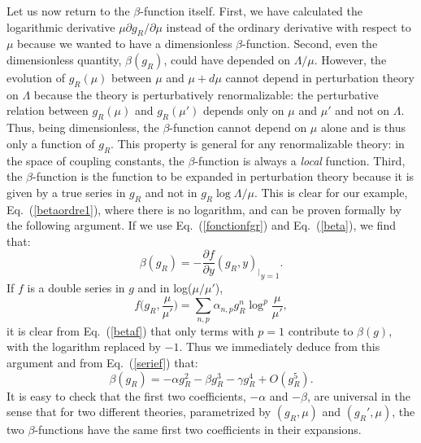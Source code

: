 \documentclass[floatfix,twocolumn,preprintnumbers,amsmath,amssymb,prb]{revtex4}
\begin{document}
{\begin{enumerate}[(i)]
\end{enumerate}

Let us now return to the $\beta$-function itself. First, we have
calculated the logarithmic derivative
$\mu\partial g_R/\partial\mu$ instead of the ordinary derivative
with respect to $\mu$ because we wanted
to have a dimensionless $\beta$-function. Second, even the
dimensionless quantity,
$\beta(g_R)$, could have depended on $\Lambda/\mu$.
However, the evolution of $g_R(\mu)$ between $\mu$ and
$\mu+d\mu$ cannot depend in perturbation theory on
$\Lambda$ because the theory is perturbatively renormalizable: the
perturbative relation between $g_R(\mu)$ and $g_R(\mu')$ depends
only on $\mu$ and
$\mu'$ and not on $\Lambda$. Thus, being dimensionless, the 
$\beta$-function cannot depend on $\mu$ alone and is thus only a
function of $g_R$. This property is general for any renormalizable
theory: in the space of coupling constants, the $\beta$-function
is always a {\em local} function. Third, the $\beta$-function is
the function to be expanded in perturbation theory because it is
given by a true series in $g_R$ and not in $g_R \log\Lambda/\mu$.
This is clear for our example, Eq.~(\ref{betaordre1}), where there
is no logarithm, and can be proven formally by the following
argument. If we use Eq.~(\ref{fonctionfgr}) and Eq.~(\ref{beta}),
we find that:
\begin{equation}
\beta(g_R) =-{\frac{\partial f}{\partial y}(g_R,y)_\big|}_{y=1}.
\label{betaf}
\end{equation}
If $f$ is a double series in $g$ and in log($\mu/\mu'$),
\begin{equation}
f\big(g_R,\frac{\mu}{\mu'}\big)=\sum_{n,p}\alpha_{n,p} g_R^n 
\log^p\frac{\mu}{\mu'},
\label{doubleserie}
\end{equation}
it is clear from Eq.~(\ref{betaf}) that only terms with $p=1$
contribute to $\beta(g)$, with the logarithm replaced by $-1$.
Thus we immediately deduce from this argument and from
Eq.~(\ref{serief}) that:
\begin{equation}
\beta(g_R)=-\alpha g_R^2 -\beta g_R^3 -\gamma g_R^4 +O(g_R^5).
\label{beta_ordre_g4}
\end{equation}
It is easy to check that the first two coefficients, $-\alpha$ and
$-\beta$, are universal in the sense that for two different
theories, parametrized by $(g_R,\mu)$ and $(g_R',\mu)$, the two
$\beta$-functions have the same first two coefficients in their
expansions.

}
\end{document}
